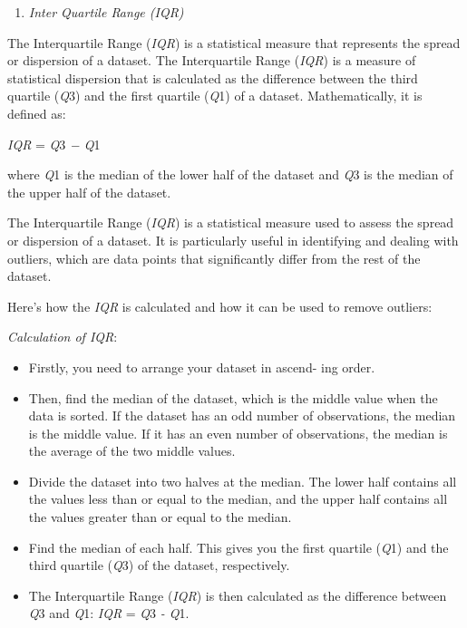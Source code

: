 \begin{multicols}{2}
\begin{enumerate}
\def\labelenumi{\Alph{enumi}.}
\setcounter{enumi}{4}
\item
  \emph{Inter Quartile Range (IQR)}
\end{enumerate}

The Interquartile Range (\emph{IQR}) is a statistical measure that
represents the spread or dispersion of a dataset. The Interquartile
Range (\emph{IQR}) is a measure of statistical dispersion that is
calculated as the difference between the third quartile (\emph{Q}3) and
the first quartile (\emph{Q}1) of a dataset. Mathematically, it is
defined as:

\emph{IQR} = \emph{Q}3 \emph{− Q}1

where \emph{Q}1 is the median of the lower half of the dataset and
\emph{Q}3 is the median of the upper half of the dataset.

The Interquartile Range (\emph{IQR}) is a statistical measure used to
assess the spread or dispersion of a dataset. It is particularly useful
in identifying and dealing with outliers, which are data points that
significantly differ from the rest of the dataset.

Here's how the \emph{IQR} is calculated and how it can be used to remove
outliers:

\emph{Calculation of IQR}:

\begin{itemize}[leftmargin=*]
\item
  Firstly, you need to arrange your dataset in ascend- ing order.
\item
  Then, find the median of the dataset, which is the middle value when
  the data is sorted. If the dataset has an odd number of observations,
  the median is the middle value. If it has an even number of
  observations, the median is the average of the two middle values.
\item
  Divide the dataset into two halves at the median. The lower half
  contains all the values less than or equal to the median, and the
  upper half contains all the values greater than or equal to the
  median.
\item
  Find the median of each half. This gives you the first quartile
  (\emph{Q}1) and the third quartile (\emph{Q}3) of the dataset,
  respectively.
\item
  The Interquartile Range (\emph{IQR}) is then calculated as the
  difference between \emph{Q}3 and \emph{Q}1: \emph{IQR} = \emph{Q}3
  \emph{- Q}1.
\end{itemize}


\end{multicols}
